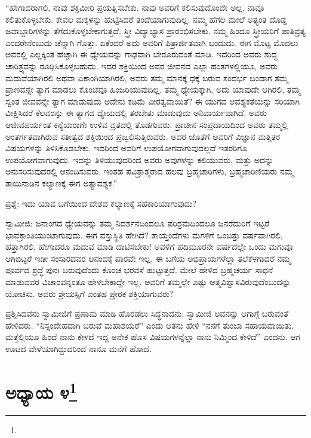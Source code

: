 “ಹೇಗಾದರಾಗಲಿ, ನಾವು ಶಕ್ತಿಮೀರಿ ಪ್ರಯತ್ನಿಸಬೇಕು. ನಾವು ಅವರಿಗೆ ಕಲಿಸುವುದೊಂದೇ ಅಲ್ಲ. ನಾವೂ ಕಲಿತುಕೊಳ್ಳಬೇಕು. ಕೇವಲ ಮಕ್ಕಳನ್ನು ಹುಟ್ಟಿಸಿದರೆ ತಂದೆಯಾಗುವುದಿಲ್ಲ. ನಮ್ಮ ಹೆಗಲ ಮೇಲೆ ಅತ್ಯಂತ ದೊಡ್ಡ ಜವಾಬ್ದಾರಿಗಳನ್ನು ತೆಗೆದುಕೊಳ್ಳಬೇಕಾಗುತ್ತದೆ. ಸ್ತ್ರೀ ವಿದ್ಯಾಭ್ಯಾಸ ಪ್ರಾರಂಭಿಸಬೇಕು. ನಮ್ಮ ಹಿಂದೂ ಸ್ತ್ರೀಯರಿಗೆ ಪಾತಿವ್ರತ್ಯ ಎಂದರೇನೆಂಬುದು ಚೆನ್ನಾಗಿ ಗೊತ್ತು. ಏಕೆಂದರೆ ಅದು ಅವರಿಗೆ ಪಿತ್ರಾರ್ಜಿತವಾಗಿ ಬಂದುದು. ಈಗ ಮೊಟ್ಟ ಮೊದಲು ಅವರಲ್ಲಿ ಎಲ್ಲಕ್ಕಿಂತ ಹೆಚ್ಚಾಗಿ ಈ ಧ್ಯೇಯವನ್ನು ಗಾಢವಾಗಿ ಬೇರೂರುವಂತೆ ಮಾಡಿ. ಇದರಿಂದ ಅವರು ಶುದ್ಧ ಚಾರಿತ್ರ್ಯವನ್ನು ರೂಢಿಸಿಕೊಳ್ಳಬಹುದು. ಇದರ ಶಕ್ತಿಯಿಂದ ಅವರ ಜೀವನದ ಎಲ್ಲಾ ಹಂತಗಳಲ್ಲಿಯೂ, ಅವರು ಮದುವೆಯಾಗಿರಲಿ ಅಥವಾ ಏಕಾಂಗಿಯಾಗಿರಲಿ, ಅವರು ತಮ್ಮ ಮಾನಕ್ಕೆ ಧಕ್ಕೆ ಬರುವ ಸಂದರ್ಭ ಬಂದಾಗ ತಮ್ಮ ಪ್ರಾಣವನ್ನೇ ತ್ಯಾಗ ಮಾಡಲು ಕೊಂಚವೂ ಹಿಂಜರಿಯುವುದಿಲ್ಲ. ತಮ್ಮ ಧ್ಯೇಯಕ್ಕಾಗಿ, ಅದು ಯಾವುದೇ ಆಗಿರಲಿ, ತಮ್ಮ ಸ್ವಂತ ಜೀವವನ್ನೇ ತ್ಯಾಗ ಮಾಡುವುದು ಅದೇನು ಕಡಿಮೆ ವೀರತ್ವವಾಯಿತೆ? ಈ ಯುಗದ ಆವಶ್ಯಕತೆಯನ್ನು ಸರಿಯಾಗಿ ವೀಕ್ಷಿಸಿದರೆ ಕೆಲವರನ್ನು ಈ ತ್ಯಾಗದ ಧ್ಯೇಯದಲ್ಲಿ ತರಬೇತು ಮಾಡುವುದು ಅನಿವಾರ್ಯವಾಗಿದೆ. ಅವರು ಆಜೀವಪರ್ಯಂತ ಕನ್ಯೆಯರಾಗೇ ಉಳಿವ ವ್ರತದಲ್ಲಿ ತೊಡಗುವರು. ಪ್ರಾಚೀನ ಸಂಪ್ರದಾಯದಿಂದ ಅವರು ತಮ್ಮಲ್ಲಿ ಅಂತರ್ಗತವಾಗಿರುವ ಸತೀತ್ವದ ಶಕ್ತಿಯಿಂದ ಪ್ರಜ್ವಲಿಸುತ್ತಿರುವರು. ಅದರ ಜೊತೆಗೆ ಅವರಿಗೆ ವಿಜ್ಞಾನ ಮತ್ತಿತರ ವಿಷಯಗಳನ್ನು ತಿಳಿಸಿಕೊಡಬೇಕು. ಇದರಿಂದ ಅವರಿಗೆ ಉಪಯೋಗವಾಗುವುದಲ್ಲದೆ ಇತರರಿಗೂ ಉಪಯೋಗವಾಗುವುದು. ಇದನ್ನು ತಿಳಿಯುವುದರಿಂದ ಅವರು ಅವುಗಳನ್ನು ಕಲಿಯುವರು, ಮತ್ತು ಅದನ್ನು ಅನುಸರಿಸುವುದರಲ್ಲಿ ಆನಂದಿಸುವರು. ಇಂತಹ ಪವಿತ್ರಾತ್ಮರಾದ ಹಲವು ಬ್ರಹ್ಮಚಾರಿಗಳು, ಬ್ರಹ್ಮಚಾರಿಣಿಯರು ನಮ್ಮ ತಾಯಿನಾಡಿನ ಕಲ್ಯಾಣಕ್ಕೆ ಈಗ ಅತ್ಯಾವಶ್ಯಕ.”

ಪ್ರಶ್ನೆ: ಇದು ಯಾವ ಬಗೆಯಿಂದ ದೇಶದ ಕಲ್ಯಾಣಕ್ಕೆ ಸಹಕಾರಿಯಾಗುವುದು?

ಸ್ವಾಮೀಜಿ: ಜನಾಂಗದ ಧ್ಯೇಯವನ್ನು ತಮ್ಮ ನಿದರ್ಶನದಿಂದಲೂ ಪರಿಶ್ರಮದಿಂದಲೂ ಜನರೆದುರಿಗೆ ಇಟ್ಟರೆ ಭಾವಕ್ರಾಂತಿಯುಂಟಾಗುವುದು. ಈಗ ವಸ್ತುಸ್ಥಿತಿ ಹೇಗಿದೆ? ತಾಯ್ತಂದೆಗಳು ಮಗಳಿಗೆ ಒಂಬತ್ತು ವರ್ಷವಾಗಿರಲಿ, ಹತ್ತಾಗಿರಲಿ, ಹೇಗಾದರೂ ಮದುವೆ ಮಾಡಿ ದಾಟಿಸಬೇಕು! ಅವಳಿಗೆ ಹದಿಮೂರನೇ ವರ್ಷದಲ್ಲೇ ಒಂದು ಮಗುವೂ ಆಗಿಬಿಟ್ಟರೆ ಇಡೀ ಸಂಸಾರದವರ ಆನಂದಕ್ಕೆ ಪಾರವೇ ಇಲ್ಲ. ಈ ಬಗೆಯ ಅಭಿಪ್ರಾಯಗಳೆಲ್ಲಾ ತಲೆಕೆಳಗಾದರೆ ನಮ್ಮ ಪೂರ್ವದ ಶ್ರದ್ಧೆ ಪುನಃ ಬರುವುದೆಂದು ಕೊಂಚ ಭರವಸೆ ಹುಟ್ಟುತ್ತದೆ. ಮೇಲೆ ಹೇಳಿದ ಬ್ರಹ್ಮಚರ್ಯ ಸಾಧನೆ ಮಾಡುವವರ ವಿಚಾರವನ್ನಂತೂ ಹೇಳಬೇಕಾದ್ದೇ ಇಲ್ಲ. ಅವರಿಗೆ ತಮ್ಮಲ್ಲೇ ಎಷ್ಟು ಆತ್ಮವಿಶ್ವಾಸವಿರುವುದೆಂಬುದನ್ನು ಯೋಚಿಸು. ಅವರು ಶ್ರೇಯಸ್ಸಿಗೆ ಎಂತಹ ಪ್ರೇರಕ ಶಕ್ತಿಯಾಗುವರು?

ಪ್ರಶ್ನಿಸಿದವನು ಸ್ವಾಮೀಜಿಗೆ ಪ್ರಣಾಮ ಮಾಡಿ ಹೊರಡಲು ಸಿದ್ಧನಾದನು. ಸ್ವಾಮೀಜಿ ಅವನನ್ನು ಆಗಾಗ್ಗೆ ಬರುವಂತೆ ಹೇಳಿದರು. “ನಿಸ್ಸಂದೇಹವಾಗಿ ಬರುವೆ ಮಹಾಶಯರೆ” ಎಂದು ಆತನು ಹೇಳಿ “ನನಗೆ ತುಂಬಾ ಸಹಾಯವಾಯಿತು. ಮತ್ತೆಲ್ಲಿಯೂ ಹಿಂದೆ ನಾನು ಕೇಳದೆ ಇದ್ದ ಅನೇಕ ಹೊಸ ವಿಷಯಗಳನ್ನೆಲ್ಲಾ ನಾನು ನಿಮ್ಮಿಂದ ಕೇಳಿದೆ” ಎಂದನು. ಆಗ ಊಟದ ವೇಳೆಯಾಗಿದ್ದುದರಿಂದ ನಾನೂ ಮನೆಗೆ ಹೋದೆ.

\newpage

\chapter[ಅಧ್ಯಾಯ ೪]{ಅಧ್ಯಾಯ ೪\protect\footnote{}}


